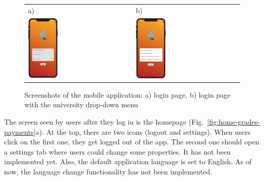 \begin{figure}[htb]
    \centering
    \begin{tabular}{@{}ll@{}}
        a) & b) \\
        {\includegraphics[page=1,width=0.300\textwidth]{fig06/login_page.png}} &
        {\includegraphics[page=7,width=0.300\textwidth]{fig06/login_page_dropdown.png}} \\
    \end{tabular}
    \caption{Screenshots of the mobile application: a) login page, b) login page with the university drop-down menu} \label{fig:login-dropdown}
\end{figure}

The screen seen by users after they log in is the homepage (Fig.~\ref{fig:home-grades-payments}a). At the top, there are two icons (logout and settings). When users click on the first one, they get logged out of the app. The second one should open a settings tab where users could change some properties. It has not been implemented yet. Also, the default application language is set to English. As of now, the language change functionality has not been implemented.

